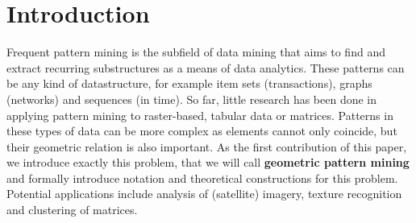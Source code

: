 \documentclass{llncs}
\begin{document}
\section{Introduction}

Frequent pattern mining is the subfield of data mining that aims to find and extract recurring substructures as a means of data analytics. These patterns can be any kind of datastructure, for example item sets (transactions), graphs (networks) and sequences (in time). So far, little research has been done in applying pattern mining to raster-based, tabular data or matrices. Patterns in these types of data can be more complex as elements cannot only coincide, but their geometric relation is also important. As the first contribution of this paper, we introduce exactly this problem, that we will call \textbf{geometric pattern mining} and formally introduce notation and theoretical constructions for this problem. Potential applications include analysis of (satellite) imagery, texture recognition and clustering of matrices.
\end{document}
